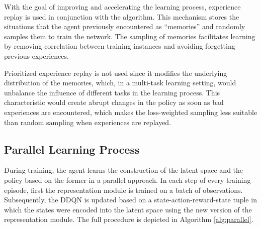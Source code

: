With the goal of improving and accelerating the learning process, experience replay \citep{replay_memory_oc} is used in conjunction with the algorithm. This mechanism stores the situations that the agent previously encountered as ``memories'' and randomly samples them to train the network. The sampling of memories facilitates learning by removing correlation between training instances and avoiding forgetting previous experiences.


Prioritized experience replay \citep{prioritized_memory} is not used since it modifies the underlying distribution of the memories, which, in a multi-task learning setting, would unbalance the influence of different tasks in the learning process. 
This characteristic would create abrupt changes in the policy as soon as bad experiences are encountered, which makes the loss-weighted sampling less suitable than random sampling when experiences are replayed.

\subsection{Parallel Learning Process}
During training, the agent learns the construction of the latent space and the policy based on the former in a parallel approach. In each step of every training episode, first the representation module is trained on a batch of observations. Subsequently, the DDQN is updated based on a state-action-reward-state tuple in which the states were encoded into the latent space using the new version of the representation module. The full procedure is depicted in Algorithm \ref{alg:parallel}.

